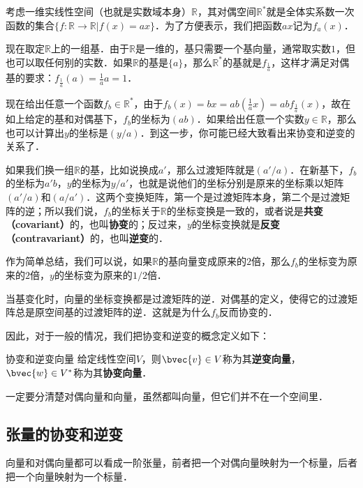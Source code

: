 \begin{example}{}
考虑一维实线性空间（也就是实数域本身）$\mathbb{R}$，其对偶空间$\mathbb{R}^*$就是全体实系数一次函数的集合$\{f:\mathbb{R}\rightarrow\mathbb{R}|f(x)=ax\}$．为了方便表示，我们把函数$ax$记为$f_a(x)$．

现在取定$\mathbb{R}$上的一组基．由于$\mathbb{R}$是一维的，基只需要一个基向量，通常取实数$1$，但也可以取任何别的实数．如果$\mathbb{R}$的基是$\{a\}$，那么$\mathbb{R}^*$的基就是$f_{\frac{1}{a}}$，这样才满足对偶基的要求：$f_{\frac{1}{a}}(a)=\frac{1}{a}a=1$．

现在给出任意一个函数$f_b\in\mathbb{R}^*$，由于$f_b(x)=bx=ab(\frac{1}{a}x)=abf_{\frac{1}{a}}(x)$，故在如上给定的基和对偶基下，$f_b$的坐标为$(ab)$．如果给出任意一个实数$y\in\mathbb{R}$，那么也可以计算出$y$的坐标是$(y/a)$．到这一步，你可能已经大致看出来协变和逆变的关系了．

如果我们换一组$\mathbb{R}$的基，比如说换成$a'$，那么过渡矩阵就是$(a'/a)$．在新基下，$f_b$的坐标为$a'b$，$y$的坐标为$y/a'$，也就是说他们的坐标分别是原来的坐标乘以矩阵$(a'/a)$和$(a/a')$．这两个变换矩阵，第一个是过渡矩阵本身，第二个是过渡矩阵的逆；所以我们说，$f_b$的坐标关于$\mathbb{R}$的坐标变换是一致的，或者说是\textbf{共变（covariant）}的，也叫\textbf{协变}的；反过来，$y$的坐标变换就是\textbf{反变（contravariant）}的，也叫\textbf{逆变}的．

作为简单总结，我们可以说，如果$\mathbb{R}$的基向量变成原来的$2$倍，那么$f_b$的坐标变为原来的$2$倍，$y$的坐标变为原来的$1/2$倍．
\end{example}

当基变化时，向量的坐标变换都是过渡矩阵的逆．对偶基的定义，使得它的过渡矩阵总是原空间基的过渡矩阵的逆．这就是为什么$f_b$反而协变的．

因此，对于一般的情况，我们把协变和逆变的概念定义如下：

\begin{definition}{协变和逆变向量}
给定线性空间$V$，则$\bvec{v}\in V$称为其\textbf{逆变向量}，$\bvec{w}\in V^*$称为其\textbf{协变向量}．
\end{definition}

一定要分清楚对偶向量和向量，虽然都叫向量，但它们并不在一个空间里．



\subsection{张量的协变和逆变}

向量和对偶向量都可以看成一阶张量，前者把一个对偶向量映射为一个标量，后者把一个向量映射为一个标量．












